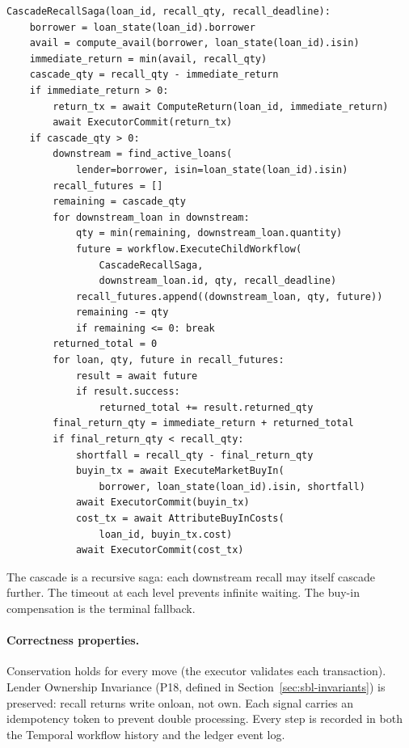 \documentclass[11pt,a4paper]{article}
\begin{document}
\begin{lstlisting}
CascadeRecallSaga(loan_id, recall_qty, recall_deadline):
    borrower = loan_state(loan_id).borrower
    avail = compute_avail(borrower, loan_state(loan_id).isin)
    immediate_return = min(avail, recall_qty)
    cascade_qty = recall_qty - immediate_return
    if immediate_return > 0:
        return_tx = await ComputeReturn(loan_id, immediate_return)
        await ExecutorCommit(return_tx)
    if cascade_qty > 0:
        downstream = find_active_loans(
            lender=borrower, isin=loan_state(loan_id).isin)
        recall_futures = []
        remaining = cascade_qty
        for downstream_loan in downstream:
            qty = min(remaining, downstream_loan.quantity)
            future = workflow.ExecuteChildWorkflow(
                CascadeRecallSaga,
                downstream_loan.id, qty, recall_deadline)
            recall_futures.append((downstream_loan, qty, future))
            remaining -= qty
            if remaining <= 0: break
        returned_total = 0
        for loan, qty, future in recall_futures:
            result = await future
            if result.success:
                returned_total += result.returned_qty
        final_return_qty = immediate_return + returned_total
        if final_return_qty < recall_qty:
            shortfall = recall_qty - final_return_qty
            buyin_tx = await ExecuteMarketBuyIn(
                borrower, loan_state(loan_id).isin, shortfall)
            await ExecutorCommit(buyin_tx)
            cost_tx = await AttributeBuyInCosts(
                loan_id, buyin_tx.cost)
            await ExecutorCommit(cost_tx)
\end{lstlisting}

\noindent The cascade is a recursive saga: each downstream recall may itself cascade further. The timeout at each level prevents infinite waiting. The buy-in compensation is the terminal fallback.

\paragraph{Correctness properties.}
Conservation holds for every move (the executor validates each transaction). Lender Ownership Invariance (P18, defined in Section~\ref{sec:sbl-invariants}) is preserved: recall returns write $\mathrm{onloan}$, not $\mathrm{own}$. Each signal carries an idempotency token to prevent double processing. Every step is recorded in both the Temporal workflow history and the ledger event log.
\end{document}
